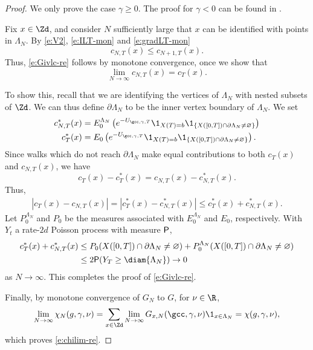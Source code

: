 \begin{proof}
We only prove the case $\gamma \ge 0$. The proof for $\gamma < 0$ can be found in
\cite{BSW-saw-sa}.

Fix $x \in \Zd$, and consider $N$ sufficiently large that $x$ can be identified
with points in $\Lambda_N$.
By \eqref{e:V2}, \eqref{e:ILT-mon} and \eqref{e:gradLT-mon}
\begin{equation}
\label{e:ctmon}
c_{N,T}(x) \leq c_{N+1,T}(x).
\end{equation}
Thus, \eqref{e:Givlc-re} follows by monotone convergence, once we show that
\begin{equation}
\lim_{N\to\infty} c_{N,T}(x) = c_T(x).
\end{equation}

To show this, recall that we are identifying the vertices of $\Lambda_N$
with nested subsets of $\Zd$. We can thus define $\partial \Lambda_N$ to be
the inner vertex boundary of $\Lambda_N$. We set
\begin{align}
c_{N,T}^*(x)
  &=
E^{\Lambda_N}_0
\left(
  e^{-U_{\gcc,\gamma,T}} \1_{X(T)=b} \1_{\{X([0, T]) \cap \partial \Lambda_N \neq \varnothing\}}
\right) \\
c_T^*(x)
  &=
E_0
\left(
  e^{-U_{\gcc,\gamma,T}} \1_{X(T)=b} \1_{\{X([0, T]) \cap \partial \Lambda_N \neq \varnothing\}}
\right).
\end{align}
Since walks which do not reach $\partial \Lambda_N$ make equal contributions to both
$c_T(x)$ and $c_{N,T}(x)$,
we have
\begin{equation}
c_T(x) - c_T^*(x) = c_{N,T}(x) - c_{N,T}^*(x).
\end{equation}
Thus,
\begin{align}
|c_T(x) - c_{N,T}(x)|
= |c_T^*(x) - c_{N,T}^*(x)|
\leq c_T^*(x) + c_{N,T}^*(x).
\end{align}
Let $P^{\Lambda_N}_0$ and $P_0$ be the measures
associated with $E^{\Lambda_N}_0$ and $E_0$, respectively.
With $Y_t$ a rate-$2d$ Poisson process with measure ${\sf P}$,
\begin{align}
 c_T^*(x) + c_{N,T}^*(x)
  &\leq P_0 (X([0, T]) \cap \partial\Lambda_N \neq \varnothing)
    + P^{\Lambda_N}_0 (X([0, T]) \cap \partial\Lambda_N \neq \varnothing) \nonumber \\
  &\leq 2 {\sf P} (Y_T \geq \diam{\Lambda_N}) \to 0
\end{align}
as $N\to\infty$.
This completes the proof of \eqref{e:Givlc-re}.

Finally, by monotone convergence of $G_N$ to $G$,
for $\nu \in \R$,
\begin{equation}
\lim_{N\to\infty} \chi_N(g, \gamma, \nu)
    = \sum_{x\in\Zd} \lim_{N\to\infty} G_{x,N}(\gcc,\gamma,\nu) \1_{x\in\Lambda_N}
    = \chi(g, \gamma, \nu),
\end{equation}
which proves \eqref{e:chilim-re}.
\end{proof}